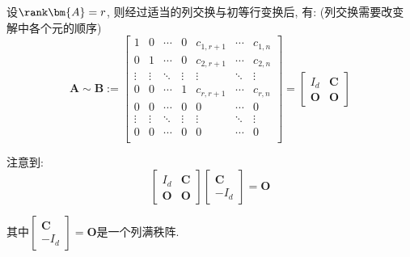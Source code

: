 \documentclass[UTF8]{ctexart}
\begin{document}
		设$\rank\bm{A}=r$, 则经过适当的列交换与初等行变换后, 有: (列交换需要改变解中各个元的顺序)
		\[\bm{A}\sim\mathbf{B}:=
		\begin{bmatrix}
			1 & 0 & \cdots & 0 & c_{1,r+1} & \cdots & c_{1,n}\\
			0 & 1 & \cdots & 0 & c_{2,r+1} & \cdots & c_{2,n}\\
			\vdots & \vdots & \ddots & \vdots & \vdots & \ddots & \vdots\\
			0 & 0 & \cdots & 1 & c_{r,r+1} & \cdots & c_{r,n}\\
			0 & 0 & \cdots & 0 & 0 & \cdots & 0\\
			\vdots & \vdots & \ddots & \vdots & \vdots & \ddots & \vdots\\
			0 & 0 & \cdots & 0 & 0 & \cdots & 0\\
		\end{bmatrix}
		=
		\begin{bmatrix}
			I_d & \mathbf{C}\\
			\mathbf{O} & \mathbf{O}
		\end{bmatrix}\]

		注意到: 
		\[\begin{bmatrix}
			I_d & \mathbf{C}\\
			\mathbf{O} & \mathbf{O}
		\end{bmatrix}
		\begin{bmatrix}
			\mathbf{C}\\
			-I_d
		\end{bmatrix}=\mathbf{O}\]

		其中$\begin{bmatrix}
			\mathbf{C}\\
			-I_d
		\end{bmatrix}=\mathbf{O}$是一个列满秩阵. 
\end{document}
